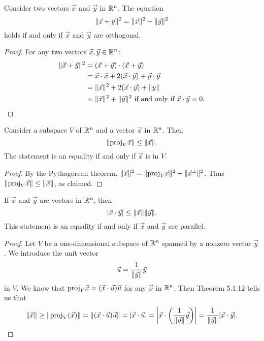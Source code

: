 \documentclass[a4paper,11pt]{article}
\begin{document}
\begin{outline}
    Consider two vectors \(\vec{x}\) and \(\vec{y}\) in \(\mathbb{R}^n\). The equation \[\|\vec{x}+\vec{y}\|^2 =
    \|\vec{x}\|^2 + \|\vec{y}\|^2 \] holds if and only if \(\vec{x}\) and \(\vec{y}\) are orthogonal.

    \begin{proof}
      For any two vectors \(\vec{x}, \vec{y} \in \mathbb{R}^n\):
      \begin{align*}
        \|\vec{x}+\vec{y}\|^2 &= (\vec{x}+\vec{y})\cdot(\vec{x}+\vec{y}) \\
                                 &= \vec{x}\cdot\vec{x} + 2(\vec{x}\cdot\vec{y}) + \vec{y}\cdot\vec{y} \\
                                 &= \|\vec{x}\|^2+2(\vec{x}\cdot\vec{y})+\|y\| \\
                                 &= \|\vec{x}\|^2+\|\vec{y}\|^2\text{ if and only if }\vec{x}\cdot\vec{y} = 0\text{.}
      \end{align*}
    \end{proof}

    Consider a subspace \(V\) of \(\mathbb{R}^n\) and a vector \(\vec{x}\) in \(\mathbb{R}^n\). Then
    \[\|\text{proj}_V\vec{x}\| \leq \|\vec{x}\|\text{.}\] The statement is an equality if and only
    if \(\vec{x}\) is in \(V\).

    \begin{proof}
      By the Pythagorean theorem, \(\|\vec{x}\|^2 = \|\text{proj}_V\vec{x}\|^2 + \|\vec{x}^{\perp}\|^2\).
      Thus \(\|\text{proj}_V\vec{x}\| \leq \|\vec{x}\|\), as claimed.
    \end{proof}

    If \(\vec{x}\) and \(\vec{y}\) are vectors in \(\mathbb{R}^n\), then \[|\vec{x}\cdot\vec{y}| \leq
    \|\vec{x}\|\|\vec{y}\|\text{.}\] This statement is an equality if and only if \(\vec{x}\)
    and \(\vec{y}\) are parallel.

    \begin{proof}
      Let \(V\) be a one-dimensional subspace of \(\mathbb{R}^n\) spanned by a nonzero vector \(\vec{y}\).
      We introduce the unit vector \[\vec{u} = \frac{1}{\|\vec{y}\|}\vec{y}\] in \(V\). We know that
      \(\text{proj}_V\vec{x} = (\vec{x}\cdot\vec{u})\vec{u}\) for any \(\vec{x}\) in \(\mathbb{R}^n\). Then Theorem 5.1.12
      tells us that
      \[ \|\vec{x}\|\geq\|\text{proj}_V(\vec{x})\|
         = \|(\vec{x}\cdot\vec{u})\vec{u}\|
         = |\vec{x}\cdot\vec{u}|=\left|\vec{x}\cdot\left(\frac{1}{\|\vec{y}\|}\vec{y}\right)\right|
         = \frac{1}{\|\vec{y}\|}|\vec{x}\cdot\vec{y}|\text{.}
      \]
    \end{proof}


\end{outline}
\end{document}
